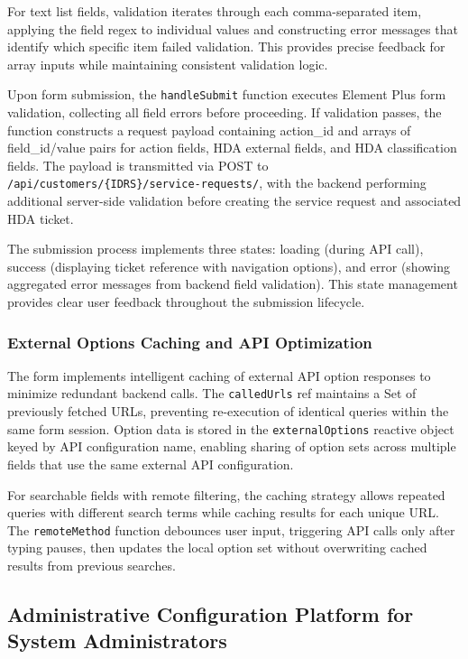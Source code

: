 For text list fields, validation iterates through each comma-separated item, applying the field regex to individual values and constructing error messages that identify which specific item failed validation. This provides precise feedback for array inputs while maintaining consistent validation logic.

Upon form submission, the \texttt{handleSubmit} function executes Element Plus form validation, collecting all field errors before proceeding. If validation passes, the function constructs a request payload containing action\_id and arrays of field\_id/value pairs for action fields, HDA external fields, and HDA classification fields. The payload is transmitted via POST to \texttt{/api/customers/\{IDRS\}/service-requests/}, with the backend performing additional server-side validation before creating the service request and associated HDA ticket.

The submission process implements three states: loading (during API call), success (displaying ticket reference with navigation options), and error (showing aggregated error messages from backend field validation). This state management provides clear user feedback throughout the submission lifecycle.

\subsubsection{External Options Caching and API Optimization}

The form implements intelligent caching of external API option responses to minimize redundant backend calls. The \texttt{calledUrls} ref maintains a Set of previously fetched URLs, preventing re-execution of identical queries within the same form session. Option data is stored in the \texttt{externalOptions} reactive object keyed by API configuration name, enabling sharing of option sets across multiple fields that use the same external API configuration.

For searchable fields with remote filtering, the caching strategy allows repeated queries with different search terms while caching results for each unique URL. The \texttt{remoteMethod} function debounces user input, triggering API calls only after typing pauses, then updates the local option set without overwriting cached results from previous searches.

\subsection{Administrative Configuration Platform for System Administrators}

